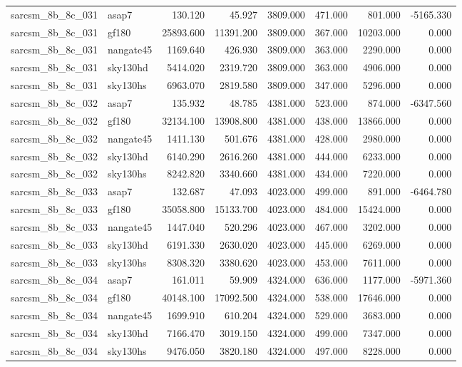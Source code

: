 \begin{tabular}{llrrrrrr}
sarcsm\_8b\_8c\_031 & asap7 & 130.120 & 45.927 & 3809.000 & 471.000 & 801.000 & -5165.330 \\
sarcsm\_8b\_8c\_031 & gf180 & 25893.600 & 11391.200 & 3809.000 & 367.000 & 10203.000 & 0.000 \\
sarcsm\_8b\_8c\_031 & nangate45 & 1169.640 & 426.930 & 3809.000 & 363.000 & 2290.000 & 0.000 \\
sarcsm\_8b\_8c\_031 & sky130hd & 5414.020 & 2319.720 & 3809.000 & 363.000 & 4906.000 & 0.000 \\
sarcsm\_8b\_8c\_031 & sky130hs & 6963.070 & 2819.580 & 3809.000 & 347.000 & 5296.000 & 0.000 \\
sarcsm\_8b\_8c\_032 & asap7 & 135.932 & 48.785 & 4381.000 & 523.000 & 874.000 & -6347.560 \\
sarcsm\_8b\_8c\_032 & gf180 & 32134.100 & 13908.800 & 4381.000 & 438.000 & 13866.000 & 0.000 \\
sarcsm\_8b\_8c\_032 & nangate45 & 1411.130 & 501.676 & 4381.000 & 428.000 & 2980.000 & 0.000 \\
sarcsm\_8b\_8c\_032 & sky130hd & 6140.290 & 2616.260 & 4381.000 & 444.000 & 6233.000 & 0.000 \\
sarcsm\_8b\_8c\_032 & sky130hs & 8242.820 & 3340.660 & 4381.000 & 434.000 & 7220.000 & 0.000 \\
sarcsm\_8b\_8c\_033 & asap7 & 132.687 & 47.093 & 4023.000 & 499.000 & 891.000 & -6464.780 \\
sarcsm\_8b\_8c\_033 & gf180 & 35058.800 & 15133.700 & 4023.000 & 484.000 & 15424.000 & 0.000 \\
sarcsm\_8b\_8c\_033 & nangate45 & 1447.040 & 520.296 & 4023.000 & 467.000 & 3202.000 & 0.000 \\
sarcsm\_8b\_8c\_033 & sky130hd & 6191.330 & 2630.020 & 4023.000 & 445.000 & 6269.000 & 0.000 \\
sarcsm\_8b\_8c\_033 & sky130hs & 8308.320 & 3380.620 & 4023.000 & 453.000 & 7611.000 & 0.000 \\
sarcsm\_8b\_8c\_034 & asap7 & 161.011 & 59.909 & 4324.000 & 636.000 & 1177.000 & -5971.360 \\
sarcsm\_8b\_8c\_034 & gf180 & 40148.100 & 17092.500 & 4324.000 & 538.000 & 17646.000 & 0.000 \\
sarcsm\_8b\_8c\_034 & nangate45 & 1699.910 & 610.204 & 4324.000 & 529.000 & 3683.000 & 0.000 \\
sarcsm\_8b\_8c\_034 & sky130hd & 7166.470 & 3019.150 & 4324.000 & 499.000 & 7347.000 & 0.000 \\
sarcsm\_8b\_8c\_034 & sky130hs & 9476.050 & 3820.180 & 4324.000 & 497.000 & 8228.000 & 0.000 \\

\end{tabular}
